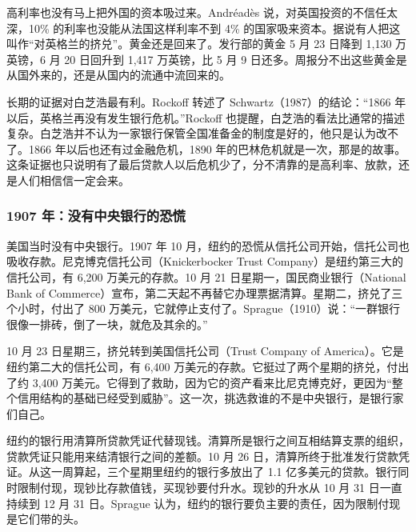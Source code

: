 高利率也没有马上把外国的资本吸过来。Andréadès 说，对英国投资的不信任太深，10\% 的利率也没能从法国这样利率不到 4\% 的国家吸来资本\cite{andreades1909}。据说有人把这叫作“对英格兰的挤兑”\cite{andreades1909}。黄金还是回来了。发行部的黄金 5 月 23 日降到 1,130 万英镑，6 月 20 日回升到 1,417 万英镑，比 5 月 9 日还多\cite{boe2017}。周报分不出这些黄金是从国外来的，还是从国内的流通中流回来的。

长期的证据对白芝浩最有利。Rockoff 转述了 Schwartz（1987）的结论：“1866 年以后，英格兰再没有发生银行危机。”\cite{rockoff2009}Rockoff 也提醒，白芝浩的看法比通常的描述复杂\cite{rockoff2009}。白芝浩并不认为一家银行保管全国准备金的制度是好的，他只是认为改不了。1866 年以后也还有过金融危机，1890 年的巴林危机就是一次\cite{dutton1984}，那是的故事。这条证据也只说明有了最后贷款人以后危机少了，分不清靠的是高利率、放款，还是人们相信信一定会来。

\subsubsection{1907 年：没有中央银行的恐慌}
美国当时没有中央银行。1907 年 10 月，纽约的恐慌从信托公司开始，信托公司也吸收存款。尼克博克信托公司（Knickerbocker Trust Company）是纽约第三大的信托公司，有 6,200 万美元的存款\cite{sprague1910}。10 月 21 日星期一，国民商业银行（National Bank of Commerce）宣布，第二天起不再替它办理票据清算\cite{sprague1910}。星期二，挤兑了三个小时，付出了 800 万美元，它就停止支付了\cite{sprague1910}。Sprague（1910）说：“一群银行很像一排砖，倒了一块，就危及其余的。”\cite{sprague1910}

10 月 23 日星期三，挤兑转到美国信托公司（Trust Company of America）。它是纽约第二大的信托公司，有 6,400 万美元的存款\cite{sprague1910}。它挺过了两个星期的挤兑，付出了约 3,400 万美元\cite{sprague1910}。它得到了救助，因为它的资产看来比尼克博克好，更因为“整个信用结构的基础已经受到威胁”\cite{sprague1910}。这一次，挑选救谁的不是中央银行，是银行家们自己。

纽约的银行用清算所贷款凭证代替现钱。清算所是银行之间互相结算支票的组织，贷款凭证只能用来结清银行之间的差额\cite{sprague1910}。10 月 26 日，清算所终于批准发行贷款凭证。从这一周算起，三个星期里纽约的银行多放出了 1.1 亿多美元的贷款\cite{sprague1910}。银行同时限制付现，现钞比存款值钱，买现钞要付升水。现钞的升水从 10 月 31 日一直持续到 12 月 31 日\cite{sprague1910}。Sprague 认为，纽约的银行要负主要的责任，因为限制付现是它们带的头\cite{sprague1910}。

